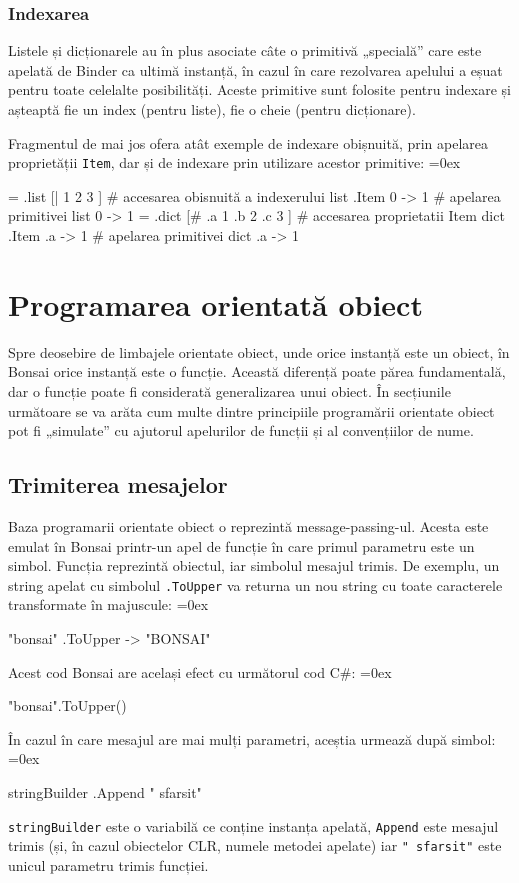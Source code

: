 \documentclass[12pt,a4paper]{memoir}
\renewcommand{\c}{\texttt}
\newenvironment{code}
{
\definecolor{shadecolor}{gray}{0.91}
\topsep=0ex
\relax
\shaded
\verbatim
}
{
\endverbatim
\endshaded
}
\begin{document}
\subsection{Indexarea}

Listele și dicționarele au în plus asociate câte o primitivă „specială” care este apelată de Binder ca ultimă instanță, în cazul în care rezolvarea apelului a eșuat pentru toate celelalte posibilități. Aceste primitive sunt folosite pentru indexare și așteaptă fie un index (pentru liste), fie o cheie (pentru dicționare).

Fragmentul de mai jos ofera atât exemple de indexare obișnuită, prin apelarea proprietății \c{Item}, dar și de indexare prin utilizare acestor primitive:
\begin{code}
= .list [| 1 2 3 ]
# accesarea obisnuită a indexerului
list .Item 0
  -> 1
# apelarea primitivei
list 0
  -> 1
= .dict [# .a 1 .b 2 .c 3 ]
# accesarea proprietatii Item
dict .Item .a
  -> 1
# apelarea primitivei
dict .a 
  -> 1
\end{code}

\chapter{Programarea orientată obiect}\label{ch:oop}

Spre deosebire de limbajele orientate obiect, unde orice instanță este un obiect, în Bonsai orice instanță este o funcție. Această diferență poate părea fundamentală, dar o funcție poate fi considerată generalizarea unui obiect. În secțiunile următoare se va arăta cum multe dintre principiile programării orientate obiect pot fi „simulate” cu ajutorul apelurilor de funcții și al convențiilor de nume.

\section{Trimiterea mesajelor}

Baza programarii orientate obiect o reprezintă message-passing-ul. Acesta este emulat în Bonsai printr-un apel de funcție în care primul parametru este un simbol. Funcția reprezintă obiectul, iar simbolul mesajul trimis. De exemplu, un string apelat cu simbolul \c{.ToUpper} va returna un nou string cu toate caracterele transformate în majuscule:
\begin{code}
"bonsai" .ToUpper
  -> "BONSAI"
\end{code}
Acest cod Bonsai are același efect cu următorul cod C\#:
\begin{code}
"bonsai".ToUpper()
\end{code}
În cazul în care mesajul are mai mulți parametri, aceștia urmează după simbol:
\begin{code}
stringBuilder .Append " sfarsit"
\end{code}
\c{stringBuilder} este o variabilă ce conține instanța apelată, \c{Append} este mesajul trimis (și, în cazul obiectelor CLR, numele metodei apelate) iar \c{" sfarsit"} este unicul parametru trimis funcției.
\end{document}
